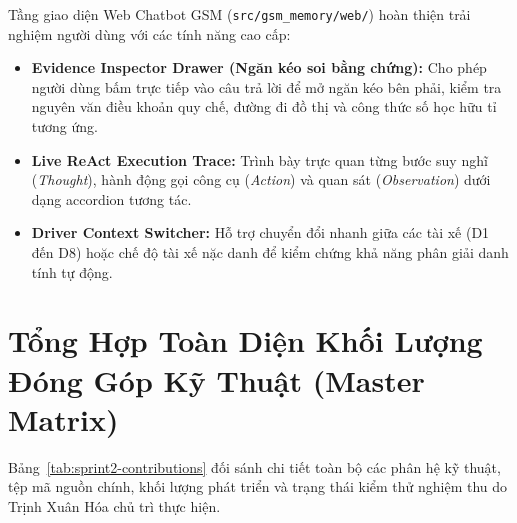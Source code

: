 \documentclass[a4paper,11pt]{article}
\begin{document}
Tầng giao diện Web Chatbot GSM (\nolinkurl{src/gsm_memory/web/}) hoàn thiện trải nghiệm người dùng với các tính năng cao cấp:
\begin{itemize}[leftmargin=1.5em,noitemsep]
    \item \textbf{Evidence Inspector Drawer (Ngăn kéo soi bằng chứng):} Cho phép người dùng bấm trực tiếp vào câu trả lời để mở ngăn kéo bên phải, kiểm tra nguyên văn điều khoản quy chế, đường đi đồ thị và công thức số học hữu tỉ tương ứng.
    \item \textbf{Live ReAct Execution Trace:} Trình bày trực quan từng bước suy nghĩ (\textit{Thought}), hành động gọi công cụ (\textit{Action}) và quan sát (\textit{Observation}) dưới dạng accordion tương tác.
    \item \textbf{Driver Context Switcher:} Hỗ trợ chuyển đổi nhanh giữa các tài xế (D1 đến D8) hoặc chế độ tài xế nặc danh để kiểm chứng khả năng phân giải danh tính tự động.
\end{itemize}

\clearpage
\section{Tổng Hợp Toàn Diện Khối Lượng Đóng Góp Kỹ Thuật (Master Matrix)}
\label{sec:contributions}

Bảng~\ref{tab:sprint2-contributions} đối sánh chi tiết toàn bộ các phân hệ kỹ thuật, tệp mã nguồn chính, khối lượng phát triển và trạng thái kiểm thử nghiệm thu do Trịnh Xuân Hóa chủ trì thực hiện.
\end{document}
